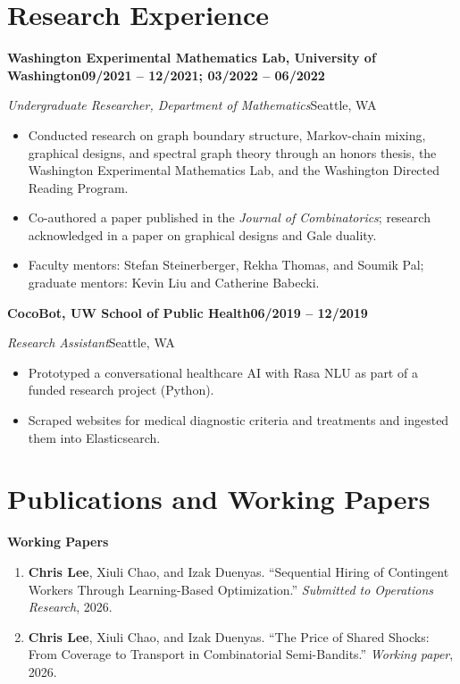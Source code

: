 \documentclass[10pt,letterpaper]{article}
\newcommand{\entry}[4]{%
  \textbf{#1}\hfill\textbf{#2}\par
  \emph{#3}\hfill #4\par
}
\newcommand{\paperstatus}[1]{{\color{muted}\emph{#1}}}
\begin{document}
\section*{Research Experience}

\entry
  {Washington Experimental Mathematics Lab, University of Washington}
  {09/2021 -- 12/2021; 03/2022 -- 06/2022}
  {Undergraduate Researcher, Department of Mathematics}
  {Seattle, WA}
\begin{itemize}
  \item Conducted research on graph boundary structure, Markov-chain mixing,
    graphical designs, and spectral graph theory through an honors thesis,
    the Washington Experimental Mathematics Lab, and the Washington Directed
    Reading Program.
  \item Co-authored a paper published in the \emph{Journal of Combinatorics};
    research acknowledged in a paper on graphical designs and Gale duality.
  \item Faculty mentors: Stefan Steinerberger, Rekha Thomas, and Soumik Pal;
    graduate mentors: Kevin Liu and Catherine Babecki.
\end{itemize}

\vspace{0.3em}
\entry
  {CocoBot, UW School of Public Health}
  {06/2019 -- 12/2019}
  {Research Assistant}
  {Seattle, WA}
\begin{itemize}
  \item Prototyped a conversational healthcare AI with Rasa NLU as part of a
    funded research project (Python).
  \item Scraped websites for medical diagnostic criteria and treatments and
    ingested them into Elasticsearch.
\end{itemize}

\section*{Publications and Working Papers}

{\small\bfseries Working Papers}
\begin{enumerate}
  \item \textbf{Chris Lee}, Xiuli Chao, and Izak Duenyas.
    ``Sequential Hiring of Contingent Workers Through Learning-Based
    Optimization.'' \paperstatus{Submitted to Operations Research}, 2026.

  \item \textbf{Chris Lee}, Xiuli Chao, and Izak Duenyas.
    ``The Price of Shared Shocks: From Coverage to Transport in Combinatorial
    Semi-Bandits.'' \paperstatus{Working paper}, 2026.
\end{enumerate}
\end{document}
